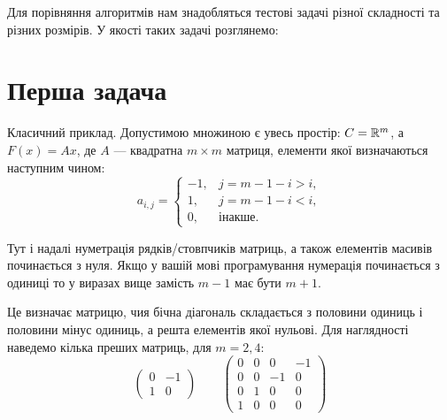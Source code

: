 Для порівняння алгоритмів нам знадобляться тестові задачі різної складності та різних розмірів. У якості таких задачі розглянемо:

\section{Перша задача}

Класичний приклад. Допустимою множиною є увесь простір: $C = \mathbb{R}^m$, а $F(x) = Ax$, де $A$ --- квадратна $m \times m$ матриця, елементи якої визначаються наступним чином:
\begin{equation}
    a_{i,j} = \begin{cases}
        -1, & j = m - 1 - i > i, \\
        1, & j = m - 1 - i < i, \\
        0, & \text{інакше}.
    \end{cases}
\end{equation}

\begin{remark}
    Тут і надалі нуметрація рядків/стовпчиків матриць, а також елементів масивів починається з нуля. Якщо у вашій мові програмування нумерація починається з одиниці то у виразах вище замість $m - 1$ має бути $m + 1$.
\end{remark}

Це визначає матрицю, чия бічна діагональ складається з половини одиниць і половини мінус одиниць, а решта елементів якої нульові. Для наглядності наведемо кілька преших матриць, для $m = 2, 4$:
\begin{equation}
    \begin{pmatrix}
        0 & -1 \\
        1 & 0
    \end{pmatrix}
    \qquad
    \begin{pmatrix}
        0 & 0 & 0 & -1 \\
        0 & 0 & -1 & 0 \\
        0 & 1 & 0 & 0 \\
        1 & 0 & 0 & 0
    \end{pmatrix}
\end{equation}

